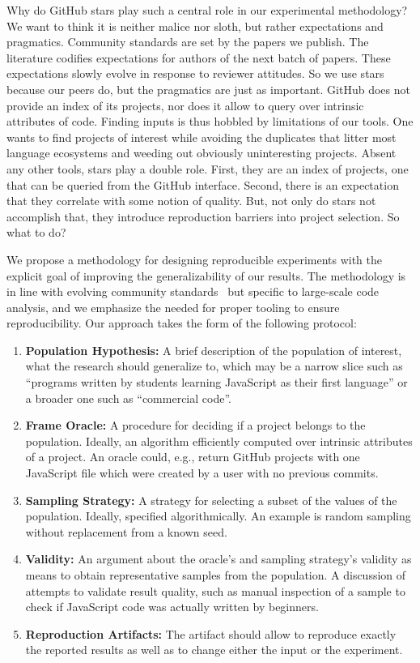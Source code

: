 \documentclass[sigconf,review,anonymous]{acmart}
\newcommand{\gh}{{GitHub}\xspace}
\begin{document}
\vspace{-2mm}

\noindent
Why do \gh stars play such a central role in our experimental methodology? We
want to think it is neither malice nor sloth, but rather expectations and
pragmatics. Community standards are set by the papers we publish. The literature
codifies expectations for authors of the next batch of papers. These
expectations slowly evolve in response to reviewer attitudes. So we use stars
because our peers do, but the pragmatics are just as important. \gh does not
provide an index of its projects, nor does it allow to query over intrinsic
attributes of code. Finding inputs is thus hobbled by limitations of our tools.
One wants to find projects of interest while avoiding the duplicates that litter
most language ecosystems and weeding out obviously uninteresting projects.
Absent any other tools, stars play a double role. First, they are an index of
projects, one that can be queried from the \gh interface. Second, there is an
expectation that they correlate with some notion of quality.
But, not only do stars not accomplish that, they introduce reproduction barriers
into project selection. So what to do?

We propose a methodology for designing reproducible experiments with the
explicit goal of improving the generalizability of our results. The
methodology is in line with evolving community standards~\cite{Ralph:2021} but
specific to large-scale code analysis, and we emphasize the needed for proper
tooling to ensure reproducibility. Our approach takes the form of the following
protocol:

\begin{enumerate}[leftmargin=*]
\item {\bf Population Hypothesis:} A brief description of the population of
  interest, what the research should generalize to, which may be a narrow slice
  such as ``programs written by students learning JavaScript as their first
  language'' or a broader one such as ``commercial code''.
\item {\bf Frame Oracle:} A procedure for deciding if a project belongs to the
  population. Ideally, an algorithm efficiently computed over intrinsic
  attributes of a project. An oracle could, e.g., return \gh projects with one
  JavaScript file which were created by a user with no previous commits.
\item {\bf Sampling Strategy:} A strategy for selecting a subset of the values
  of the population. Ideally, specified algorithmically. An example is random
  sampling without replacement from a known seed.
\item {\bf Validity:} An argument about the oracle's and sampling strategy's
  validity as means to obtain representative samples from the population. A
  discussion of attempts to validate result quality, such as manual inspection
  of a sample to check if JavaScript code was actually written by beginners.
\item {\bf Reproduction Artifacts:} The artifact should allow to reproduce
  exactly the reported results as well as to change either the input or the
  experiment.
\end{enumerate}
\end{document}
